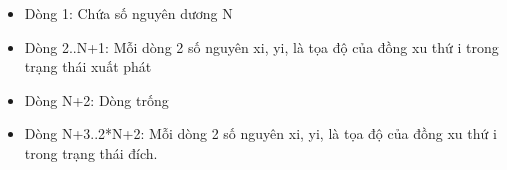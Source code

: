 \begin{itemize}
	\item     Dòng 1: Chứa số nguyên dương N   
	\item     Dòng 2..N+1: Mỗi dòng 2 số nguyên xi, yi, là tọa độ của đồng xu thứ i trong trạng thái xuất phát   
	\item     Dòng N+2: Dòng trống   
	\item     Dòng N+3..2*N+2: Mỗi dòng 2 số nguyên xi, yi, là tọa độ của đồng xu thứ i trong trạng thái đích.   
\end{itemize}